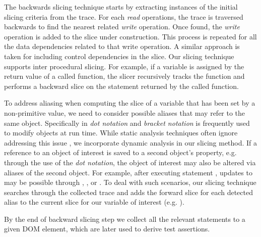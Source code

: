 The backwards slicing technique starts by extracting instances of the initial slicing criteria from the trace. For each \textit{read} operations, the trace is traversed backwards to find the nearest related \textit{write} operation. Once found, the \textit{write} operation is added to the slice under construction. This process is repeated for all the data dependencies related to that write operation. A similar approach is taken for including control dependencies in the slice.
Our slicing technique supports inter procedural slicing. For example, if a variable is assigned by the return value of a called function, the slicer recursively tracks the function and performs a backward slice on the statement returned by the called function. 

To address aliasing when computing the slice of a variable that has been set by a non-primitive value, we need to consider possible aliases that may refer to the same object. Specifically in \javascript \textit{dot notation} and \textit{bracket notation} is frequently used to modify objects at run time. While static analysis techniques often ignore addressing this issue \cite{Feldthaus:icse13}, we incorporate dynamic analysis in our slicing method. If a reference to an object of interest is saved to a second object's property, e.g. through the use of the \textit{dot notation}, the object of interest may also be altered via aliases of the second object. For example, after executing statement , updates to  may be possible through , , or . To deal with such scenarios, our slicing technique searches through the collected trace and adds the forward slice for each detected alias to the current slice for our variable of interest (e.g. ). 

By the end of backward slicing step we collect all the relevant statements to a given DOM element, which are later used to derive test assertions.    